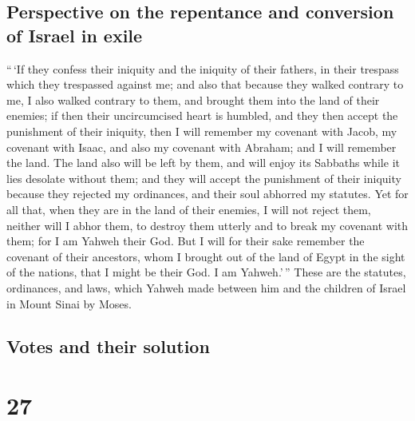 \hypertarget{perspective-on-the-repentance-and-conversion-of-israel-in-exile}{%
\subsection{Perspective on the repentance and conversion of Israel in
exile}\label{perspective-on-the-repentance-and-conversion-of-israel-in-exile}}

 ``\,`If they confess their iniquity and the iniquity of
their fathers, in their trespass which they trespassed against me; and
also that because they walked contrary to me,  I also
walked contrary to them, and brought them into the land of their
enemies; if then their uncircumcised heart is humbled, and they then
accept the punishment of their iniquity,  then I will
remember my covenant with Jacob, my covenant with Isaac, and also my
covenant with Abraham; and I will remember the land.  The
land also will be left by them, and will enjoy its Sabbaths while it
lies desolate without them; and they will accept the punishment of their
iniquity because they rejected my ordinances, and their soul abhorred my
statutes.  Yet for all that, when they are in the land of
their enemies, I will not reject them, neither will I abhor them, to
destroy them utterly and to break my covenant with them; for I am Yahweh
their God.  But I will for their sake remember the
covenant of their ancestors, whom I brought out of the land of Egypt in
the sight of the nations, that I might be their God. I am Yahweh.'\,''
 These are the statutes, ordinances, and laws, which
Yahweh made between him and the children of Israel in Mount Sinai by
Moses.

\hypertarget{votes-and-their-solution}{%
\subsection{Votes and their solution}\label{votes-and-their-solution}}

\hypertarget{section-26}{%
\section{27}\label{section-26}}

